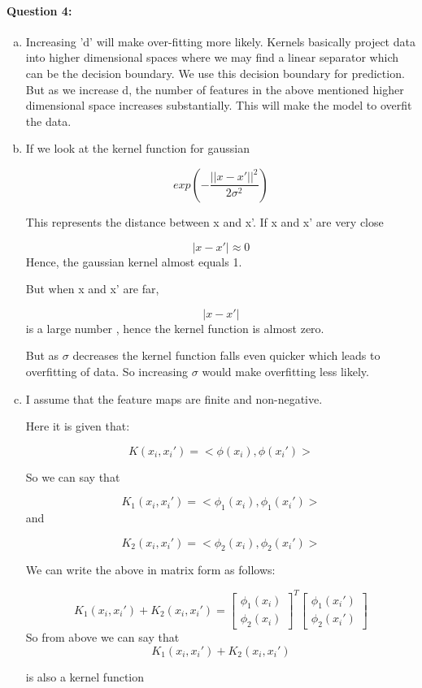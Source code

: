 \documentclass[letterpaper,11pt]{article}
\begin{document}
\paragraph{Question 4:}
\begin{enumerate}[(a)]
\item
Increasing 'd' will make over-fitting more likely. Kernels basically project data into higher dimensional spaces where we may find a linear separator which can be the decision boundary. We use this decision boundary for prediction. But as we increase d, the number of features in the above mentioned higher dimensional space increases substantially. This will make the model to overfit the data.

\item

If we look at the kernel function for gaussian

\[
	exp(-\frac{||x-x'||^2}{2\sigma^2})	
\]


This represents the distance between x and x'.
If x and x' are very close 

\[
	|x-x'|\approx0
\] 
Hence, the gaussian kernel almost equals 1. 

But when x and x' are far, 

\[
	|x-x'|
\] 
is a large number , hence the kernel function is almost zero. 

But as $\sigma$ decreases the kernel function falls even quicker which leads to overfitting of data. So increasing $\sigma$ would make overfitting less likely.
	
\item

I assume that the feature maps are finite and non-negative.

Here it is given that: 

\[
	K(x_i,x_i') = <\phi(x_i),\phi(x_i')>
\]

So we can say that 

\[
	K_1(x_i,x_i') = <\phi_1(x_i),\phi_1(x_i')>
\] and 

\[
	K_2(x_i,x_i') = <\phi_2(x_i),\phi_2(x_i')>
\]

We can write the above in matrix form as follows:

\[
	K_1(x_i,x_i') + K_2(x_i,x_i') = \begin{bmatrix} {\phi_1(x_i)} \\ {\phi_2(x_i)} \end{bmatrix}^T \begin{bmatrix} {\phi_1(x_i')} \\ {\phi_2(x_i')} \end{bmatrix}
\]
So from above we can say that 
\[
	K_1(x_i,x_i') + K_2(x_i,x_i') 
\]

is also a kernel function 
\end{enumerate}
\end{document}
